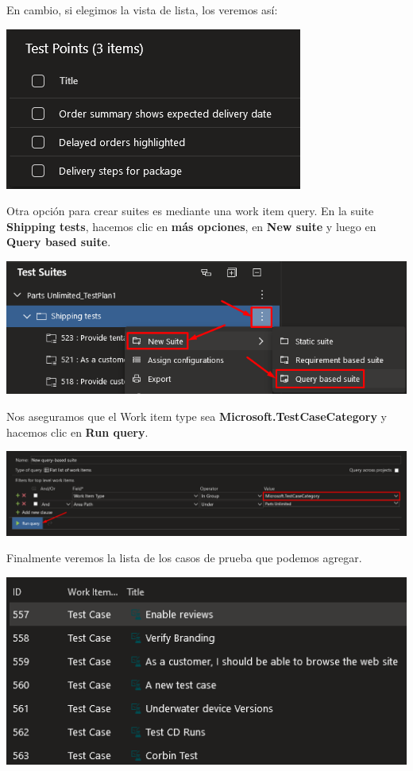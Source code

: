 \documentclass{elsarticle}
\begin{document}
En cambio, si elegimos la vista de lista, los veremos así:
\begin{center}
	\includegraphics{img/Screenshot_56.png}
\end{center}

Otra opción para crear suites es mediante una work item query. En la suite \textbf{Shipping tests}, hacemos clic en \textbf{más opciones}, en \textbf{New suite} y luego en \textbf{Query based suite}.
\begin{center}
	\includegraphics[width=\columnwidth]{img/Screenshot_57.png}
\end{center}

Nos aseguramos que el Work item type sea \textbf{Microsoft.TestCaseCategory} y hacemos clic en \textbf{Run query}.
\begin{center}
	\includegraphics[width=\columnwidth]{img/Screenshot_58.png}
\end{center}

Finalmente veremos la lista de los casos de prueba que podemos agregar.
\begin{center}
	\includegraphics[width=\columnwidth]{img/Screenshot_59.png}
\end{center}
\end{document}
